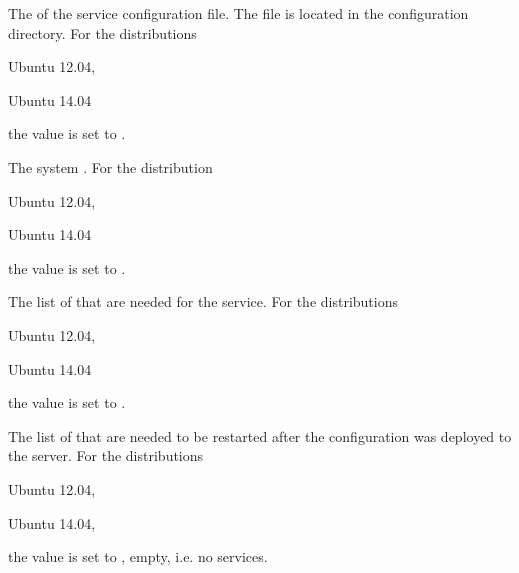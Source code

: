 
The  of the service configuration file. 
The file is located in the configuration directory.
For the distributions
\begin{inparaitem}
\item[\TheDistribution{ubuntu}] Ubuntu 12.04,
\item[\TheDistribution{ubuntu}] Ubuntu 14.04
\end{inparaitem}
the value is set to .


The system . 
For the distribution
\begin{inparaitem}
\item[\TheDistribution{ubuntu}] Ubuntu 12.04,
\item[\TheDistribution{ubuntu}] Ubuntu 14.04
\end{inparaitem}
the value is set to .


The list of  that are needed for the service.
For the distributions
\begin{inparaitem}
\item[\TheDistribution{ubuntu}] Ubuntu 12.04,
\item[\TheDistribution{ubuntu}] Ubuntu 14.04
\end{inparaitem}
the value is set to .


The list of  that are needed to be restarted after 
the configuration was deployed to the server. 
For the distributions
\begin{inparaitem}
\item[\TheDistribution{ubuntu}] Ubuntu 12.04,
\item[\TheDistribution{ubuntu}] Ubuntu 14.04,
\end{inparaitem}
the value is set to \qcode{}, empty, i.e. no services.

